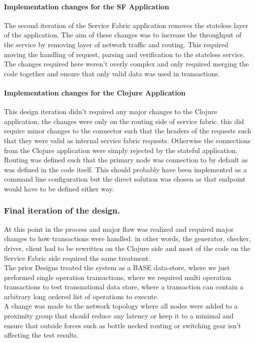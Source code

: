 \documentclass[a4paper,10pt,titlepage]{report}
\begin{document}
\paragraph*{Implementation changes for the SF Application}
The second iteration of the Service Fabric application removes the stateless layer of the application, The aim of these changes was to increase the throughput of the service by removing  layer of network traffic and routing. This required moving the handling of request, parsing and verification to the stateless service.   \\

The changes required here weren't overly complex and only required merging the code together and ensure that only valid data was used in transactions. 
\\

\paragraph*{Implementation changes for the Clojure Application}
This design iteration didn't required any major changes to the Clojure application, the changes were only on the routing side of service fabric. this did require minor changes to the connector such that the headers of the requests such that they were valid as internal service fabric requests. Otherwise  the connections from the Clojure application were simply rejected by the stateful application. Routing was defined such that the primary node was connection to by default as was defined in the code itself. This should probably have been implemented as a command line configuration but the direct solution was chosen as that endpoint would have to be defined either way. 


\subsubsection{Final iteration of the design.}
At this point in the process and major flaw was realized and required major changes to how transactions were handled. in other words, the generator, checker, driver, client had to be rewritten on the Clojure side and most of the code on the Service Fabric side required the same treatment. 
\\
The prior Designs treated the system as a BASE data-store, where we just preformed single operation transactions, where we required multi operation transactions to test transnational data store, where a transaction can contain a  arbitrary long ordered list of operations to execute. 
\\
A change was made to the network topology where all nodes were added to a proximity group that should reduce any latency or keep it to a minimal and ensure that outside forces such as bottle necked routing or switching gear isn't affecting the test results.  \\
\end{document}
